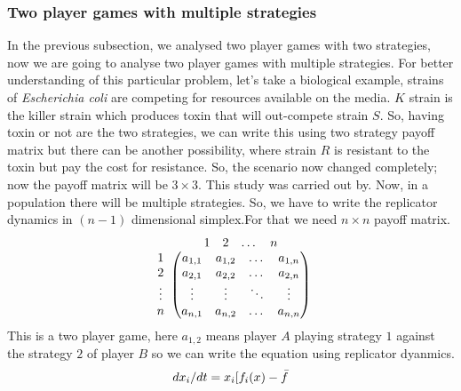 \documentclass{article}
\begin{document}
\subsubsection{Two player games with multiple strategies}
\label{subsubsec:Two player games with multiple strategies}
In the previous subsection, we analysed two player games with two strategies, now we are going to analyse two player games with multiple strategies. For better understanding of this particular problem, let's take a biological example, strains of \textit{Escherichia coli} are competing for resources available on the media. $K$ strain is the killer strain which produces toxin that will out-compete strain $S$. So, having toxin or not are the two strategies, we can write this using two strategy payoff matrix but there can be another possibility, where strain $R$ is resistant to the toxin but pay the cost for resistance. So, the scenario now changed completely; now the payoff matrix will be $3 \times 3$. This study was carried out by\citep{Kerr2002}\citep{Czaran2002}.
Now, in a population there will be multiple strategies. So, we have to write the replicator dynamics in $(n-1)$ dimensional simplex.For that we need $n\times n$ payoff matrix.
\[
\begin{array}{c@{}c}
   & \begin{array}{cccc} 1 & 2 & \dots & n \end{array} \\ 
   \begin{array}{c} 
       1 \\ 
       2 \\ 
       \vdots \\ 
       n 
   \end{array} 
   & 
   \begin{pmatrix}
       a_{1,1} & a_{1,2} & \dots & a_{1,n} \\
       a_{2,1} & a_{2,2} & \dots & a_{2,n} \\
       \vdots & \vdots & \ddots & \vdots \\
       a_{n,1} & a_{n,2} & \dots & a_{n,n}
   \end{pmatrix}
\end{array}
\] \label{eq:7}
This is a two player game, here $a_{1,2}$ means player $A$ playing strategy $1$ against the strategy $2$ of player $B$ so we can write the equation using replicator dyanmics.
\begin{equation}
dx_i/dt=x_i[f_i(x)-\bar{f}\nonumber\\
\end{equation}
\end{document}
